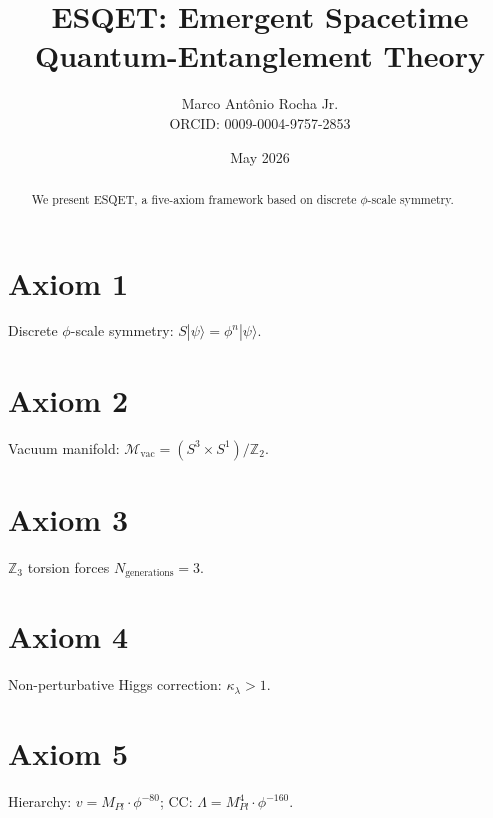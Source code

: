 \documentclass[11pt]{article}
\title{ESQET: Emergent Spacetime Quantum-Entanglement Theory}
\author{Marco Antônio Rocha Jr. \\ ORCID: 0009-0004-9757-2853}
\date{May 2026}
\begin{document}
\maketitle

\begin{abstract}
We present ESQET, a five-axiom framework based on discrete $\phi$-scale symmetry.
\end{abstract}

\section{Axiom 1}
Discrete $\phi$-scale symmetry: $S|\psi\rangle = \phi^n|\psi\rangle$.

\section{Axiom 2}
Vacuum manifold: $\mathcal{M}_{\text{vac}} = (S^3 \times S^1)/\mathbb{Z}_2$.

\section{Axiom 3}
$\mathbb{Z}_3$ torsion forces $N_{\text{generations}} = 3$.

\section{Axiom 4}
Non-perturbative Higgs correction: $\kappa_\lambda > 1$.

\section{Axiom 5}
Hierarchy: $v = M_{Pl} \cdot \phi^{-80}$; CC: $\Lambda = M_{Pl}^4 \cdot \phi^{-160}$.
\end{document}
